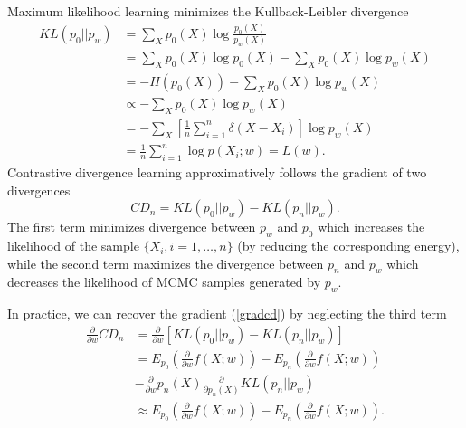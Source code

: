 \documentclass[11pt]{article}
\def\L{L}
\def\I{X}
\begin{document}
Maximum likelihood learning minimizes the Kullback-Leibler divergence
\begin{align}
KL(p_0||p_w)
&= \sum_X p_0(X) \log \frac{p_0(X)}{p_w(X)} \\
&= \sum_X p_0(X) \log p_0(X) - \sum_X p_0(X) \log p_w(X) \\
&= -H(p_0(X)) - \sum_X p_0(X) \log p_w(X) \\
&\propto - \sum_X p_0(X) \log p_w(X) \\
&= - \sum_X \left[\frac{1}{n}\sum_{i=1}^n \delta(\I-\I_i)\right] \log p_w(X) \\
&= \frac{1}{n} \sum_{i=1}^n \log p(\I_i;w)
= \L(w).
\end{align}
Contrastive divergence learning approximatively follows the gradient of two divergences
\begin{equation}
CD_n = KL(p_0||p_w) - KL(p_n||p_w).\label{CD}
\end{equation}
The first term minimizes divergence between $p_w$ and $p_0$ which increases the likelihood of the sample $\{\I_i, i=1,\ldots,n\}$ (by reducing the corresponding energy), while the second term maximizes the divergence between $p_n$ and $p_w$ which decreases the likelihood of MCMC samples generated by $p_w$.

In practice, we can recover the gradient (\ref{gradcd}) by neglecting the third term
\begin{align}
\frac{\partial}{\partial w}CD_n
&= \frac{\partial}{\partial w}\left[ KL(p_0||p_w) - KL(p_n||p_w) \right] \\
&=  E_{p_0}(\frac{\partial}{\partial w} f(\I;w)) - E_{p_n}(\frac{\partial}{\partial w} f(\I;w)) \\
&- \frac{\partial}{\partial w} p_n(X)\frac{\partial }{\partial p_n(X)} KL(p_n||p_w) \\
&\approx  E_{p_0}(\frac{\partial}{\partial w} f(\I;w)) - E_{p_n}(\frac{\partial}{\partial w} f(\I;w)).
\end{align}



 
\end{document}
